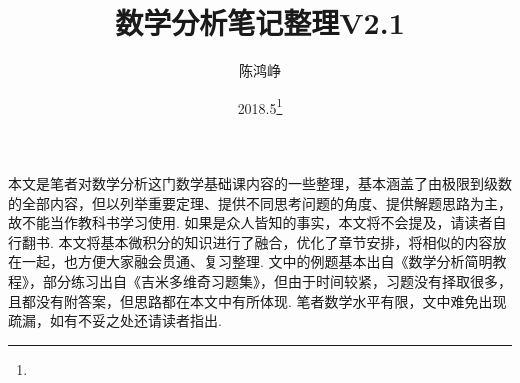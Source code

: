 \documentclass[11pt,UTF8]{ctexart}
\title{数学分析笔记整理V2.1}
\author{陈鸿峥}
\date{2018.5\footnote{\text{Build 20180507}}}%
\renewcommand{\thefootnote}{\fnsymbol{footnote}}
\begin{document}
\maketitle
\renewcommand{\thefootnote}{\arabic{footnote}}
\setcounter{footnote}{0}

\setcounter{tocdepth}{2}%
\tableofcontents
\bigskip\bigskip\bigskip

\par 本文是笔者对数学分析这门数学基础课内容的一些整理，基本涵盖了由极限到级数的全部内容，但以列举重要定理、提供不同思考问题的角度、提供解题思路为主，故不能当作教科书学习使用. 如果是众人皆知的事实，本文将不会提及，请读者自行翻书. 本文将基本微积分的知识进行了融合，优化了章节安排，将相似的内容放在一起，也方便大家融会贯通、复习整理. 文中的例题基本出自《数学分析简明教程》，部分练习出自《吉米多维奇习题集》，但由于时间较紧，习题没有择取很多，且都没有附答案，但思路都在本文中有所体现. 笔者数学水平有限，文中难免出现疏漏，如有不妥之处还请读者指出. 







\end{document}
